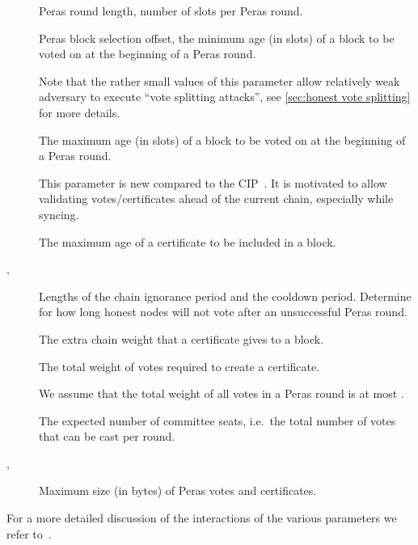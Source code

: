 \begin{description}
\item[\perasRoundSlots]
  Peras round length, number of slots per Peras round.
\item[\perasBlockMinSlots]
  Peras block selection offset, the minimum age (in slots) of a block to be voted on at the beginning of a Peras round.

  Note that the rather small values of this parameter allow relatively weak adversary to execute \enquote{vote splitting attacks}, see \cref{sec:honest vote splitting} for more details.
\item[\perasBlockMaxSlots]
  The maximum age (in slots) of a block to be voted on at the beginning of a Peras round.

  This parameter is new compared to the CIP~\cite{peras-cip}.
  It is motivated to allow validating votes/certificates ahead of the current chain, especially while syncing.
\item[\perasCertMaxSlots]
  The maximum age of a certificate to be included in a block.
\item[\perasIgnoranceRounds, \perasCooldownRounds]
  Lengths of the chain ignorance period and the cooldown period.
  Determine for how long honest nodes will not vote after an unsuccessful Peras round.
\item[\perasBoost]
  The extra chain weight that a certificate gives to a block.
\item[\perasQuorum]
  The total weight of votes required to create a certificate.

  We assume that the total weight of all votes in a Peras round is at most \perasN{}.
\item[\perasN]
  The expected number of committee seats, i.e.\ the total number of votes that can be cast per round.
\item[\perasVoteSizeLimit, \perasCertSizeLimit]
  Maximum size (in bytes) of Peras votes and certificates.
\end{description}


For a more detailed discussion of the interactions of the various parameters we refer to~\cite{peras-cip}.

